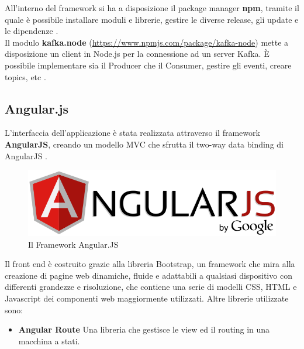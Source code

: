 \documentclass[12pt]{article}
\begin{document}
All'interno del framework si ha a disposizione il package manager \textbf{npm}, tramite il quale è possibile installare moduli e librerie, gestire le diverse release, gli update e le dipendenze \cite{nodejs}.\\

Il modulo \textbf{kafka.node} (\href{https://www.npmjs.com/package/kafka-node}{https://www.npmjs.com/package/kafka-node}) mette a disposizione un client in Node.js per la connessione ad un server Kafka. \`E possibile implementare sia il Producer che il Consumer, gestire gli eventi, creare topics, etc \cite{nodejs}.

\subsection{Angular.js}

L'interfaccia dell'applicazione è stata realizzata attraverso il framework \textbf{AngularJS}, creando un modello MVC che sfrutta il two-way data binding di AngularJS \cite{angularjs}.

\begin{figure}[H]
	\centering
	\includegraphics[scale=0.50]{images/angular.png}
	\caption{Il Framework Angular.JS}
	\label{angular}
\end{figure}

Il front end è costruito grazie alla libreria Bootstrap, un framework che mira alla creazione di pagine web dinamiche, fluide e adattabili a qualsiasi dispositivo con differenti grandezze e risoluzione, che contiene una serie di modelli CSS, HTML e Javascript dei componenti web maggiormente utilizzati. Altre librerie utilizzate sono: 
\begin{itemize}
	\item \textbf{Angular Route} Una libreria che gestisce le view ed il routing in una macchina a stati.
\end{itemize}
\end{document}
